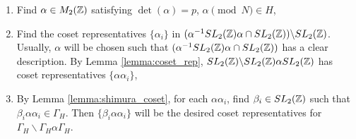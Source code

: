 \begin{enumerate}
    \item Find $\alpha \in M_2(\mathbb{Z})$ satisfying $\det(\alpha) = p$, $\alpha \pmod{N} \in H$,
    \item Find the coset representatives $\{\alpha_i\}$ in $(\alpha^{-1} SL_2(\mathbb{Z}) \alpha \cap  SL_2(\mathbb{Z}))\backslash SL_2(\mathbb{Z})$. Usually, $\alpha$ will be chosen such that $(\alpha^{-1} SL_2(\mathbb{Z}) \alpha \cap  SL_2(\mathbb{Z}))$ has a clear description. By Lemma \ref{lemma:coset_rep}, $SL_2(\mathbb{Z})\backslash SL_2(\mathbb{Z}) \alpha SL_2(\mathbb{Z})$ has coset representatives $\{\alpha \alpha_i\}$,
    \item By Lemma \ref{lemma:shimura_coset}, for each $\alpha \alpha_i$, find $\beta_i \in SL_2(\mathbb{Z})$ such that $\beta_i \alpha \alpha_i \in \Gamma_H$. Then $\{ \beta_i \alpha \alpha_i\}$ will be the desired coset representatives for $\Gamma_H \backslash \Gamma_H \alpha \Gamma_H$.
\end{enumerate}

